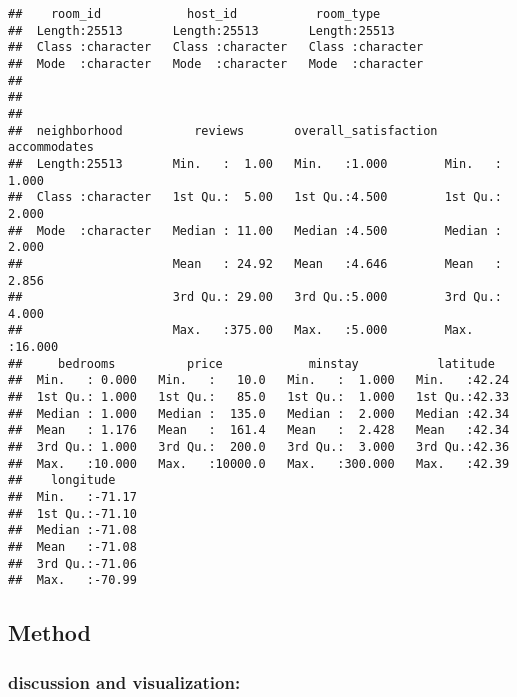 \documentclass[]{article}
\newenvironment{Shaded}{\begin{snugshade}}{\end{snugshade}}
\newcommand{\KeywordTok}[1]{\textcolor[rgb]{0.13,0.29,0.53}{\textbf{#1}}}
\newcommand{\CommentTok}[1]{\textcolor[rgb]{0.56,0.35,0.01}{\textit{#1}}}
\newcommand{\OperatorTok}[1]{\textcolor[rgb]{0.81,0.36,0.00}{\textbf{#1}}}
\newcommand{\NormalTok}[1]{#1}
\begin{document}
\begin{verbatim}
##    room_id            host_id           room_type        
##  Length:25513       Length:25513       Length:25513      
##  Class :character   Class :character   Class :character  
##  Mode  :character   Mode  :character   Mode  :character  
##                                                          
##                                                          
##                                                          
##  neighborhood          reviews       overall_satisfaction  accommodates   
##  Length:25513       Min.   :  1.00   Min.   :1.000        Min.   : 1.000  
##  Class :character   1st Qu.:  5.00   1st Qu.:4.500        1st Qu.: 2.000  
##  Mode  :character   Median : 11.00   Median :4.500        Median : 2.000  
##                     Mean   : 24.92   Mean   :4.646        Mean   : 2.856  
##                     3rd Qu.: 29.00   3rd Qu.:5.000        3rd Qu.: 4.000  
##                     Max.   :375.00   Max.   :5.000        Max.   :16.000  
##     bedrooms          price            minstay           latitude    
##  Min.   : 0.000   Min.   :   10.0   Min.   :  1.000   Min.   :42.24  
##  1st Qu.: 1.000   1st Qu.:   85.0   1st Qu.:  1.000   1st Qu.:42.33  
##  Median : 1.000   Median :  135.0   Median :  2.000   Median :42.34  
##  Mean   : 1.176   Mean   :  161.4   Mean   :  2.428   Mean   :42.34  
##  3rd Qu.: 1.000   3rd Qu.:  200.0   3rd Qu.:  3.000   3rd Qu.:42.36  
##  Max.   :10.000   Max.   :10000.0   Max.   :300.000   Max.   :42.39  
##    longitude     
##  Min.   :-71.17  
##  1st Qu.:-71.10  
##  Median :-71.08  
##  Mean   :-71.08  
##  3rd Qu.:-71.06  
##  Max.   :-70.99
\end{verbatim}

\subsection{Method}\label{method}

\subsubsection{discussion and
visualization:}\label{discussion-and-visualization}

\begin{Shaded}
\end{Shaded}
\end{document}
